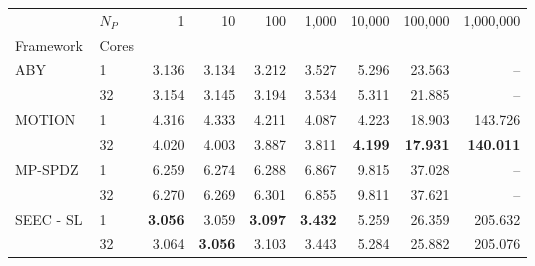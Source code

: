 \begin{tabular}{llrrrrrrr}
\toprule
 & $N_P$ & 1 & 10 & 100 & 1,000 & 10,000 & 100,000 & 1,000,000 \\
Framework & Cores &  &  &  &  &  &  &  \\
\midrule
\multirow[c]{2}{*}{ABY~\cite{DSZ15}} & 1 & 3.136 & 3.134 & 3.212 & 3.527 & 5.296 & 23.563 & -- \\
 & 32 & 3.154 & 3.145 & 3.194 & 3.534 & 5.311 & 21.885 & -- \\
\cline{1-9}
\multirow[c]{2}{*}{MOTION~\cite{BDST22}} & 1 & 4.316 & 4.333 & 4.211 & 4.087 & 4.223 & 18.903 & 143.726 \\
 & 32 & 4.020 & 4.003 & 3.887 & 3.811 & \bfseries 4.199 & \bfseries 17.931 & \bfseries 140.011 \\
\cline{1-9}
\multirow[c]{2}{*}{MP-SPDZ~\cite{CCS:Keller20}} & 1 & 6.259 & 6.274 & 6.288 & 6.867 & 9.815 & 37.028 & -- \\
 & 32 & 6.270 & 6.269 & 6.301 & 6.855 & 9.811 & 37.621 & -- \\
\cline{1-9}
\multirow[c]{2}{*}{SEEC - SL} & 1 & \bfseries 3.056 & 3.059 & \bfseries 3.097 & \bfseries 3.432 & 5.259 & 26.359 & 205.632 \\
 & 32 & 3.064 & \bfseries 3.056 & 3.103 & 3.443 & 5.284 & 25.882 & 205.076 \\
\bottomrule
\end{tabular}

